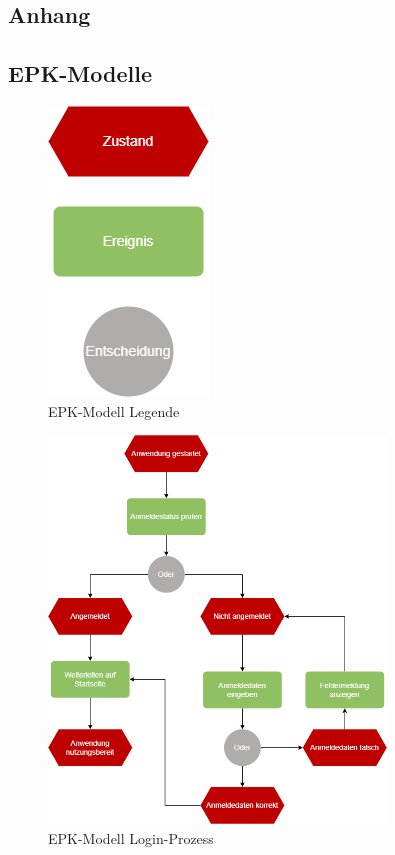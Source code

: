 \begin{appendix}
  \section{Anhang}\label{sec:anhang}

  \subsection{EPK-Modelle}\label{subsec:epk-modelle}

  \begin{figure}[H]
        \centering
        \includegraphics[]{images/ReQ_EPK_Legende}
        \caption{EPK-Modell Legende}
        \label{fig:epk_legende}
    \end{figure}

    \begin{figure}[H]
        \centering
        \includegraphics[width=0.8\textwidth]{images/ReQ_Login_EPK}
        \caption{EPK-Modell Login-Prozess}
        \label{fig:epk_login}
    \end{figure}


\end{appendix}
